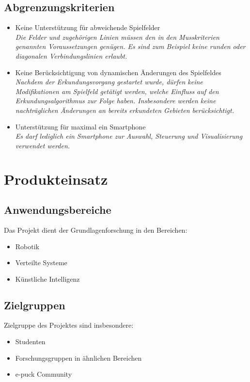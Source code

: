 \documentclass[10pt,a4paper]{article}
\begin{document}
		\subsection{Abgrenzungskriterien}
			\begin{itemize}
				\item Keine Unterstützung für abweichende Spielfelder
					\\ \textsl{Die Felder und zugehörigen Linien müssen den in den Musskriterien genannten Voraussetzungen
						genügen. Es sind zum Beispiel keine runden oder diagonalen Verbindungslinien erlaubt.}
				\item Keine Berücksichtigung von dynamischen Änderungen des Spielfeldes
					\\ \textsl{Nachdem der Erkundungsvorgang gestartet wurde, dürfen keine Modifikationen am
						Spielfeld getätigt werden, welche Einfluss auf den Erkundungsalgorithmus zur Folge haben.
						Insbesondere werden keine nachträglichen Änderungen an bereits erkundeten Gebieten berücksichtigt.}			
				\item Unterstützung für maximal ein Smartphone
					\\ \textsl{Es darf lediglich ein Smartphone zur Auswahl, Steuerung und Visualisierung verwendet
						werden.}		
			\end{itemize}
	\section{Produkteinsatz}
		\subsection{Anwendungsbereiche}
			Das Projekt dient der Grundlagenforschung in den Bereichen:
			\begin{itemize}
				\item Robotik
				\item Verteilte Systeme
				\item Künstliche Intelligenz
			\end{itemize}
		\subsection{Zielgruppen}
			Zielgruppe des Projektes sind insbesondere: 
			\begin{itemize}
				\item Studenten
				\item Forschungsgruppen in ähnlichen Bereichen
				\item e-puck Community
			\end{itemize}
\end{document}
